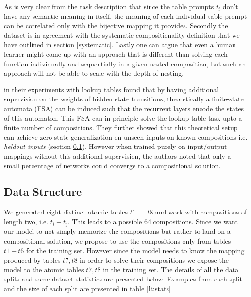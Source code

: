 As is very clear from the task description that since the table prompts $t_i$ don't have any semantic meaning in itself, the meaning of each individual table prompt can be correlated only with the bijective mapping it provides. Secondly the dataset is in agreement with the systematic compositionality definition that we have outlined in section \ref{systematic}. Lastly one can argue that even a human learner might come up with an approach that is different than solving each function individually and sequentially in a given nested composition, but such an approach will not be able to scale with the depth of nesting.

\cite{Liska2018} in their experiments with lookup tables found that by having additional supervision on the weights of hidden state transitions, theoretically a finite-state automata (FSA) can be induced such that the recurrent layers encode the states of this automaton. This FSA can in principle solve the lookup table task upto a finite number of compositions. They further showed that this theoretical setup can achieve zero state generalization on unseen inputs on known compositions i.e. \textit{heldout inputs} (section \ref{lt:splits}). However when trained purely on input/output mappings without this additional supervision, the authors noted that only a small percentage of networks could converge to a compositional solution.


\subsection{Data Structure}\label{lt:splits}
We generated eight distinct atomic tables $t1......t8$ and work with compositions of length two, i.e. $t_i - t_j$. This leads to a possible 64 compositions. Since we want our model to not simply memorize the compositions but rather to land on a compositional solution, we propose to use the compositions only from tables $t1 - t6$ for the training set. However since the model needs to know the mapping produced by tables $t7, t8$ in order to solve their compositions we expose the model to the atomic tables $t7, t8$ in the training set. The details of all the data splits and some dataset statistics are presented below. Examples from each split and the size of each split are presented in table \ref{lt:stats}

